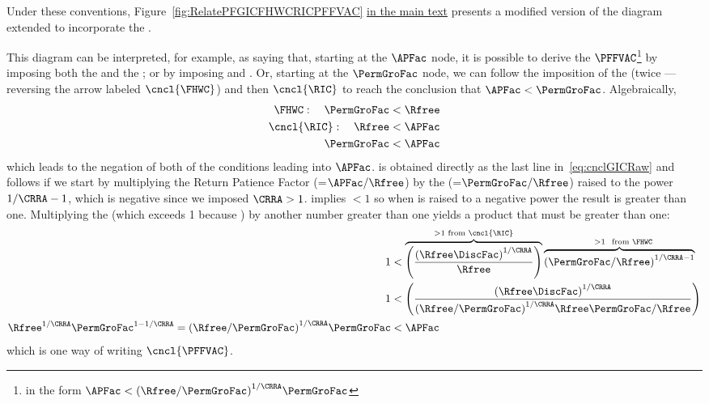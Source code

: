 \documentclass[\econtexRoot/BufferStockTheory]{subfiles}
\begin{document}
Under these conventions, Figure~\ref{fig:RelatePFGICFHWCRICPFFVAC} \hyperlink{RelatePFGICFHWCRICPFFVAC}{in the main text} presents a modified version of the diagram extended to incorporate the {\PFFVAC}.



  














This diagram can be interpreted, for example, as saying  that, starting at the $\APFac$ node, it is possible to derive the $\PFFVAC$\footnote{in the form $\APFac < {(\Rfree/\PermGroFac)}^{1/\CRRA}\PermGroFac$} by imposing both the {\GICRaw} and the {\FHWC}; or by imposing {\RIC} and \cncl{\FHWC}.
Or, starting at the $\PermGroFac$ node, we can follow the imposition of the {\FHWC} (twice --- reversing the arrow labeled $\cncl{\FHWC}$) and then $\cncl{\RIC}$ to reach the conclusion that $\APFac < \PermGroFac$.
Algebraically,
\begin{equation}\begin{gathered}\begin{aligned}
  {\FHWC}:~~~ \PermGroFac & < \Rfree 
  \\ \cncl{\RIC}:~~~ \Rfree & < \APFac 
  \\ \PermGroFac & < \APFac \label{eq:cnclGICRaw}
\end{aligned}\end{gathered}\end{equation}
which leads to the negation of both of the conditions leading into $\APFac$.
\cncl{\GICRaw} is obtained directly as the last line in~\eqref{eq:cnclGICRaw} and \cncl{\PFFVAC} follows if we start by multiplying the Return Patience Factor ({\RPFacDefn}=$\APFac/\Rfree$) by the {\FHWFacDefn} (=$\PermGroFac/\Rfree$) raised to the power $1/\CRRA-1$, which is negative since we imposed $\CRRA > 1$.
{\FHWC} implies {\FHWFacDefn} $< 1$ so when {\FHWFacDefn} is raised to a negative power the result is greater than one.
Multiplying the {\RPFacDefn} (which exceeds 1 because \cncl{\RIC}) by another number greater than one yields a product that must be greater than one:
\begin{equation}\begin{gathered}\begin{aligned}
  1  & < \overbrace{\left(\frac{{(\Rfree \DiscFac)}^{1/\CRRA}}{\Rfree}\right)}^{>1 \text{~from~}\cncl{\RIC}}\overbrace{{\left(\PermGroFac/\Rfree\right)}^{1/\CRRA-1}}^{\phantom{\ldots}>1~\text{~from~} \FHWC} \notag
  \\ 1  & < \left(\frac{{(\Rfree \DiscFac)}^{1/\CRRA}}{{(\Rfree/\PermGroFac)}^{1/\CRRA}\Rfree\PermGroFac/\Rfree}\right) \label{eq:cnclFHWFacDefnAndcnclRICImplycnclPFFVAC}
  \\ \Rfree^{1/\CRRA}\PermGroFac^{1 - 1/\CRRA} = {(\Rfree/\PermGroFac)}^{1/\CRRA} \PermGroFac  & < \APFac \notag
\end{aligned}\end{gathered}\end{equation}
which is one way of writing $\cncl{\PFFVAC}$.
\end{document}
